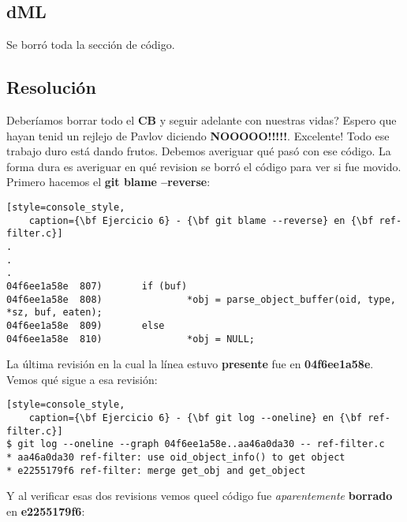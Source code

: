 \subsection*{dML}
Se borró toda la sección de código.

\subsection*{Resolución}
Deberíamos borrar todo el {\bf CB} y seguir adelante con nuestras vidas? Espero que hayan tenid un rejlejo de Pavlov diciendo
{\bf NOOOOO!!!!!}. Excelente! Todo ese trabajo duro está dando frutos. Debemos averiguar qué pasó con ese código. La forma
dura es averiguar en qué revision se borró el código para ver si fue movido. Primero hacemos el {\bf git blame --reverse}:

\begin{lstlisting}[style=console_style,
	caption={\bf Ejercicio 6} - {\bf git blame --reverse} en {\bf ref-filter.c}]
.
.
.
04f6ee1a58e  807)       if (buf)
04f6ee1a58e  808)               *obj = parse_object_buffer(oid, type, *sz, buf, eaten);
04f6ee1a58e  809)       else
04f6ee1a58e  810)               *obj = NULL;
\end{lstlisting}

La última revisión en la cual la línea estuvo {\bf presente} fue en {\bf 04f6ee1a58e}. Vemos qué sigue a esa revisión:
\begin{lstlisting}[style=console_style,
	caption={\bf Ejercicio 6} - {\bf git log --oneline} en {\bf ref-filter.c}]
$ git log --oneline --graph 04f6ee1a58e..aa46a0da30 -- ref-filter.c
* aa46a0da30 ref-filter: use oid_object_info() to get object
* e2255179f6 ref-filter: merge get_obj and get_object
\end{lstlisting}

Y al verificar esas dos revisions vemos queel código fue {\it aparentemente} {\bf borrado} en {\bf e2255179f6}:

